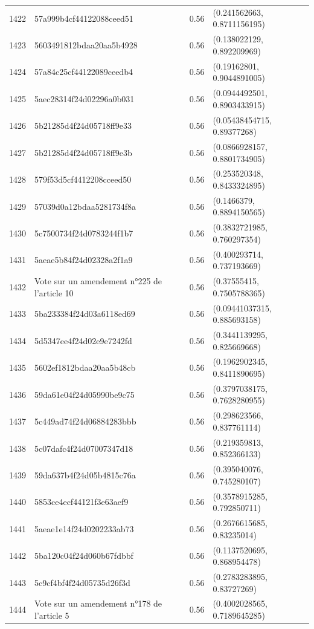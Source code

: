 \begin{table}[ht]
\begin{tabular}{rlrl}
  1422 & 57a999b4cf44122088ceed51 & 0.56 & (0.241562663, 0.8711156195) \\ 
  1423 & 5603491812bdaa20aa5b4928 & 0.56 & (0.138022129, 0.892209969) \\ 
  1424 & 57a84c25cf44122089ceedb4 & 0.56 & (0.19162801, 0.9044891005) \\ 
  1425 & 5aec28314f24d02296a0b031 & 0.56 & (0.0944492501, 0.8903433915) \\ 
  1426 & 5b21285d4f24d05718ff9e33 & 0.56 & (0.05438454715, 0.89377268) \\ 
  1427 & 5b21285d4f24d05718ff9e3b & 0.56 & (0.0866928157, 0.8801734905) \\ 
  1428 & 579f53d5cf4412208cceed50 & 0.56 & (0.253520348, 0.8433324895) \\ 
  1429 & 57039d0a12bdaa5281734f8a & 0.56 & (0.1466379, 0.8894150565) \\ 
  1430 & 5c7500734f24d0783244f1b7 & 0.56 & (0.3832721985, 0.760297354) \\ 
  1431 & 5aeae5b84f24d02328a2f1a9 & 0.56 & (0.400293714, 0.737193669) \\ 
  1432 & Vote sur un amendement n°225 de l'article 10 & 0.56 & (0.37555415, 0.7505788365) \\ 
  1433 & 5ba233384f24d03a6118ed69 & 0.56 & (0.09441037315, 0.885693158) \\ 
  1434 & 5d5347ee4f24d02e9e7242fd & 0.56 & (0.3441139295, 0.825669668) \\ 
  1435 & 5602ef1812bdaa20aa5b48cb & 0.56 & (0.1962902345, 0.8411890695) \\ 
  1436 & 59da61e04f24d05990be9c75 & 0.56 & (0.3797038175, 0.7628280955) \\ 
  1437 & 5c449ad74f24d06884283bbb & 0.56 & (0.298623566, 0.837761114) \\ 
  1438 & 5c07dafc4f24d07007347d18 & 0.56 & (0.219359813, 0.852366133) \\ 
  1439 & 59da637b4f24d05b4815c76a & 0.56 & (0.395040076, 0.745280107) \\ 
  1440 & 5853ce4ecf44121f3e63aef9 & 0.56 & (0.3578915285, 0.792850711) \\ 
  1441 & 5aeae1e14f24d0202233ab73 & 0.56 & (0.2676615685, 0.83235014) \\ 
  1442 & 5ba120c04f24d060b67fdbbf & 0.56 & (0.1137520695, 0.868954478) \\ 
  1443 & 5c9cf4bf4f24d05735d26f3d & 0.56 & (0.2783283895, 0.83727269) \\ 
  1444 & Vote sur un amendement n°178 de l'article 5 & 0.56 & (0.4002028565, 0.7189645285) \\ 

\end{tabular}
\end{table}
